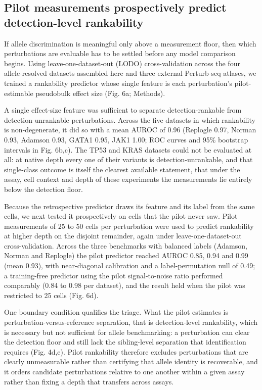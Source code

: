 \documentclass[11pt,letterpaper]{article}
\begin{document}
\subsection*{Pilot measurements prospectively predict detection-level rankability}

If allele discrimination is meaningful only above a measurement floor, then which perturbations are evaluable has to be settled before any model comparison begins. Using leave-one-dataset-out (LODO) cross-validation across the four allele-resolved datasets assembled here and three external Perturb-seq atlases, we trained a rankability predictor whose single feature is each perturbation's pilot-estimable pseudobulk effect size (Fig. 6a; Methods).

A single effect-size feature was sufficient to separate detection-rankable from detection-unrankable perturbations. Across the five datasets in which rankability is non-degenerate, it did so with a mean AUROC of 0.96 (Replogle 0.97, Norman 0.93, Adamson 0.93, GATA1 0.95, JAK1 1.00; ROC curves and 95\% bootstrap intervals in Fig. 6b,c). The TP53 and KRAS datasets could not be evaluated at all: at native depth every one of their variants is detection-unrankable, and that single-class outcome is itself the clearest available statement, that under the assay, cell context and depth of these experiments the measurements lie entirely below the detection floor.

Because the retrospective predictor draws its feature and its label from the same cells, we next tested it prospectively on cells that the pilot never saw. Pilot measurements of 25 to 50 cells per perturbation were used to predict rankability at higher depth on the disjoint remainder, again under leave-one-dataset-out cross-validation. Across the three benchmarks with balanced labels (Adamson, Norman and Replogle) the pilot predictor reached AUROC 0.85, 0.94 and 0.99 (mean 0.93), with near-diagonal calibration and a label-permutation null of 0.49; a training-free predictor using the pilot signal-to-noise ratio performed comparably (0.84 to 0.98 per dataset), and the result held when the pilot was restricted to 25 cells (Fig. 6d).

One boundary condition qualifies the triage. What the pilot estimates is perturbation-versus-reference separation, that is detection-level rankability, which is necessary but not sufficient for allele benchmarking: a perturbation can clear the detection floor and still lack the sibling-level separation that identification requires (Fig. 4d,e). Pilot rankability therefore excludes perturbations that are clearly unmeasurable rather than certifying that allele identity is recoverable, and it orders candidate perturbations relative to one another within a given assay rather than fixing a depth that transfers across assays.
\end{document}
